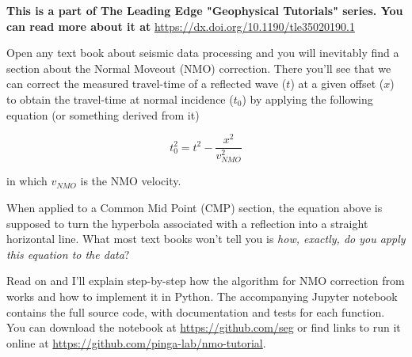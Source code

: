 \textbf{This is a part of The Leading Edge "Geophysical Tutorials" series.
You can read more about it at} \url{https://dx.doi.org/10.1190/tle35020190.1}

Open any text book about seismic data processing and you will inevitably find a
section about the Normal Moveout (NMO) correction.
There you'll see that we can correct the measured travel-time of a reflected
wave ($t$) at a given offset ($x$) to obtain the travel-time at normal
incidence ($t_0$) by applying the following equation (or something derived
from it)

\begin{equation}
t_0^2=t^2-\dfrac{x^2}{v_{NMO}^2}
\end{equation}

in which $v_{NMO}$ is the NMO velocity.

When applied to a Common Mid Point (CMP) section, the equation above is
supposed to turn the hyperbola associated with a reflection into a straight
horizontal line.
What most text books won't tell you is \textit{how, exactly, do you apply this
equation to the data}?

Read on and I'll explain step-by-step how the algorithm for NMO correction from
\citet{Yilmaz_2001} works and how to implement it in Python.
The accompanying Jupyter notebook \citep{Perez_2007} contains the full source
code, with documentation and tests for each function.
You can download the notebook at
\href{github.com/seg}{https://github.com/seg} or
find links to run it online at
\href{github.com/pinga-lab/nmo-tutorial}{https://github.com/pinga-lab/nmo-tutorial}.
